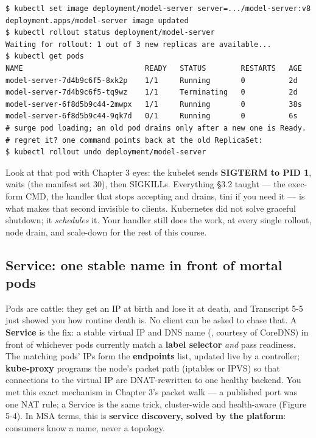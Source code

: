 \begin{terminalbox}
\begin{Verbatim}[breaklines=true,breakanywhere=true,fontsize=\small,formatcom=\color{tbbtermfg},codes=\tbbcodeactive]
$ kubectl set image deployment/model-server server=.../model-server:v8
deployment.apps/model-server image updated
$ kubectl rollout status deployment/model-server
Waiting for rollout: 1 out of 3 new replicas are available...
$ kubectl get pods
NAME                            READY   STATUS        RESTARTS   AGE
model-server-7d4b9c6f5-8xk2p    1/1     Running       0          2d
model-server-7d4b9c6f5-tq9wz    1/1     Terminating   0          2d
model-server-6f8d5b9c44-2mwpx   1/1     Running       0          38s
model-server-6f8d5b9c44-9qk7d   0/1     Running       0          6s
# surge pod loading; an old pod drains only after a new one is Ready.
# regret it? one command points back at the old ReplicaSet:
$ kubectl rollout undo deployment/model-server
\end{Verbatim}
\end{terminalbox}

Look at that  pod with Chapter 3 eyes: the kubelet sends \textbf{SIGTERM to PID 1}, waits  (the manifest set 30), then SIGKILLs. Everything §3.2 taught — the exec-form CMD, the handler that stops accepting and drains, tini if you need it — is what makes that  second invisible to clients. Kubernetes did not solve graceful shutdown; it \textit{schedules} it. Your handler still does the work, at every single rollout, node drain, and scale-down for the rest of this course.

\subsection*{Service: one stable name in front of mortal pods}

Pods are cattle: they get an IP at birth and lose it at death, and Transcript 5-5 just showed you how routine death is. No client can be asked to chase that. A \textbf{Service} is the fix: a stable virtual IP and DNS name (, courtesy of CoreDNS) in front of whichever pods currently match a \textbf{label selector} \textit{and} pass readiness. The matching pods' IPs form the \textbf{endpoints} list, updated live by a controller; \textbf{kube-proxy} programs the node's packet path (iptables or IPVS) so that connections to the virtual IP are DNAT-rewritten to one healthy backend. You met this exact mechanism in Chapter 3's  packet walk — a published port was one NAT rule; a Service is the same trick, cluster-wide and health-aware (Figure 5-4). In MSA terms, this is \textbf{service discovery, solved by the platform}: consumers know a name, never a topology.

